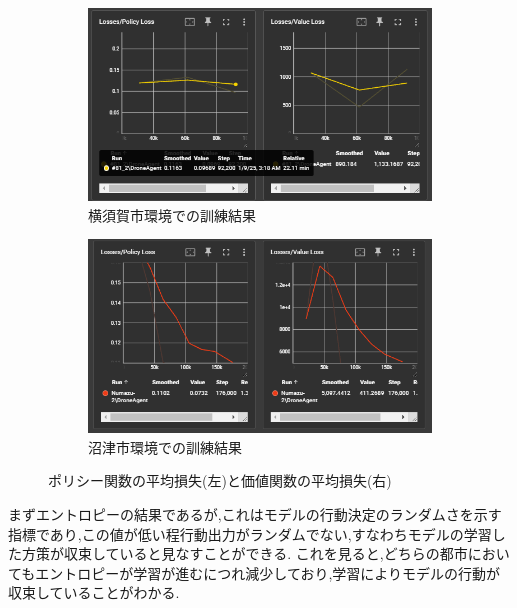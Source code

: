 \begin{figure}[H]
  \centering
  \begin{subfigure}{0.45\textwidth}
      \centering
      \includegraphics[width=\textwidth]{Figures/Yokosuka-Loss.png}
      \caption{横須賀市環境での訓練結果}
      \label{fig:YokosukaModel-Result2}
  \end{subfigure}
  \begin{subfigure}{0.45\textwidth}
      \centering
      \includegraphics[width=\textwidth]{Figures/Numazu-Loss.png}
      \caption{沼津市環境での訓練結果}
      \label{fig:NumazuModel-Result2}
  \end{subfigure}
  \caption{ポリシー関数の平均損失(左)と価値関数の平均損失(右)}
  \label{fig:Model-Result-Errors}
\end{figure}
まずエントロピーの結果であるが,これはモデルの行動決定のランダムさを示す指標であり,この値が低い程行動出力がランダムでない,すなわちモデルの学習した方策が収束していると見なすことができる.
これを見ると,どちらの都市においてもエントロピーが学習が進むにつれ減少しており,学習によりモデルの行動が収束していることがわかる.
